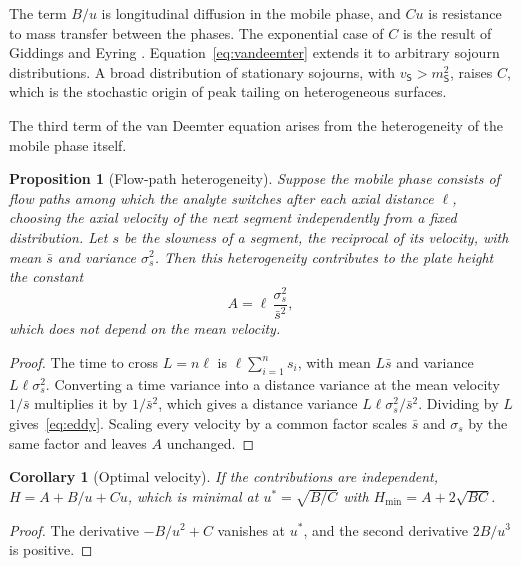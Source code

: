 \documentclass[11pt,a4paper]{article}
\newtheorem{proposition}[theorem]{Proposition}
\newtheorem{corollary}[theorem]{Corollary}
\theoremstyle{definition}
\theoremstyle{remark}
\newcommand{\Sta}{\mathsf{S}}
\begin{document}
The term $B/u$ is longitudinal diffusion in the mobile phase, and $Cu$ is resistance to mass transfer between the phases.
The exponential case of $C$ is the result of Giddings and Eyring \citep{giddings1955}.
Equation~\eqref{eq:vandeemter} extends it to arbitrary sojourn distributions.
A broad distribution of stationary sojourns, with $v_\Sta>m_\Sta^{2}$, raises $C$, which is the stochastic origin of peak tailing on heterogeneous surfaces.

The third term of the van Deemter equation arises from the heterogeneity of the mobile phase itself.

\begin{proposition}[Flow-path heterogeneity]
\label{prop:eddy}
Suppose the mobile phase consists of flow paths among which the analyte switches after each axial distance $\ell$, choosing the axial velocity of the next segment independently from a fixed distribution.
Let $s$ be the \emph{slowness} of a segment, the reciprocal of its velocity, with mean $\bar s$ and variance $\sigma_s^{2}$.
Then this heterogeneity contributes to the plate height the constant
\begin{equation}
A=\ell\,\frac{\sigma_s^{2}}{\bar s^{2}},
\label{eq:eddy}
\end{equation}
which does not depend on the mean velocity.
\end{proposition}

\begin{proof}
The time to cross $L=n\ell$ is $\ell\sum_{i=1}^{n}s_i$, with mean $L\bar s$ and variance $L\ell\sigma_s^{2}$.
Converting a time variance into a distance variance at the mean velocity $1/\bar s$ multiplies it by $1/\bar s^{2}$, which gives a distance variance $L\ell\sigma_s^{2}/\bar s^{2}$.
Dividing by $L$ gives~\eqref{eq:eddy}.
Scaling every velocity by a common factor scales $\bar s$ and $\sigma_s$ by the same factor and leaves $A$ unchanged.
\end{proof}

\begin{corollary}[Optimal velocity]
\label{cor:optimum}
If the contributions are independent, $H=A+B/u+Cu$, which is minimal at $u^\ast=\sqrt{B/C}$ with $H_{\min}=A+2\sqrt{BC}$.
\end{corollary}

\begin{proof}
The derivative $-B/u^{2}+C$ vanishes at $u^\ast$, and the second derivative $2B/u^{3}$ is positive.
\end{proof}

\end{document}
